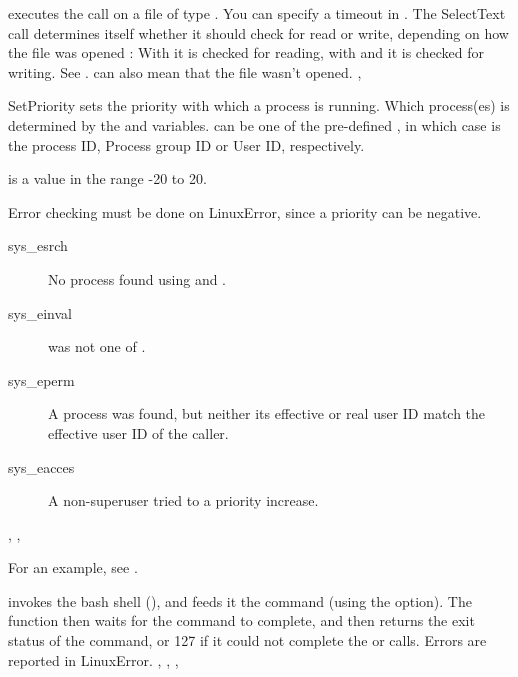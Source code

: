 

{ executes the  call on a file of type
. You can specify a timeout in . The SelectText call
determines itself whether it should check for read or write, depending on
how the file was opened : With  it is checked for reading, with
 and  it is checked for writing.}
{See .  can also mean that the file wasn't
opened.}
{, }

{
SetPriority sets the priority with which a process is running.
Which process(es) is determined by the  and  variables.
 can be one of the pre-defined , in which case  is the process ID, Process group ID or
User ID, respectively.

 is a value in the range -20 to 20.
}
{
 Error checking must be done on LinuxError, since a priority can be negative.
 \begin{description}
 \item[sys\_esrch] No process found using  and .
 \item[sys\_einval]  was not one of .
 \item[sys\_eperm] A process was found, but neither its effective or real
 user ID match the effective user ID of the caller.
 \item [sys\_eacces] A non-superuser tried to a priority increase.
 \end{description}
 }
{, , }

For an example, see .



{ invokes the bash shell (), and feeds it the
command  (using the  option). The function then waits
for the command to complete, and then returns the exit
status of the command, or 127 if it could not complete the  
or  calls.
}
{Errors are reported in LinuxError.}
{, , , }




